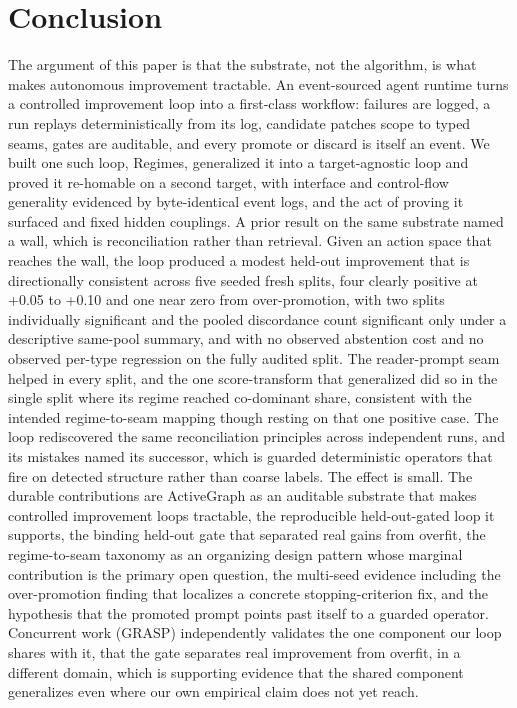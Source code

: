 \section{Conclusion}

The argument of this paper is that the substrate, not the algorithm, is what makes autonomous improvement tractable. An event-sourced agent runtime turns a controlled improvement loop into a first-class workflow: failures are logged, a run replays deterministically from its log, candidate patches scope to typed seams, gates are auditable, and every promote or discard is itself an event. We built one such loop, Regimes, generalized it into a target-agnostic loop and proved it re-homable on a second target, with interface and control-flow generality evidenced by byte-identical event logs, and the act of proving it surfaced and fixed hidden couplings. A prior result on the same substrate named a wall, which is reconciliation rather than retrieval. Given an action space that reaches the wall, the loop produced a modest held-out improvement that is directionally consistent across five seeded fresh splits, four clearly positive at +0.05 to +0.10 and one near zero from over-promotion, with two splits individually significant and the pooled discordance count significant only under a descriptive same-pool summary, and with no observed abstention cost and no observed per-type regression on the fully audited split. The reader-prompt seam helped in every split, and the one score-transform that generalized did so in the single split where its regime reached co-dominant share, consistent with the intended regime-to-seam mapping though resting on that one positive case. The loop rediscovered the same reconciliation principles across independent runs, and its mistakes named its successor, which is guarded deterministic operators that fire on detected structure rather than coarse labels. The effect is small. The durable contributions are ActiveGraph as an auditable substrate that makes controlled improvement loops tractable, the reproducible held-out-gated loop it supports, the binding held-out gate that separated real gains from overfit, the regime-to-seam taxonomy as an organizing design pattern whose marginal contribution is the primary open question, the multi-seed evidence including the over-promotion finding that localizes a concrete stopping-criterion fix, and the hypothesis that the promoted prompt points past itself to a guarded operator. Concurrent work (GRASP) independently validates the one component our loop shares with it, that the gate separates real improvement from overfit, in a different domain, which is supporting evidence that the shared component generalizes even where our own empirical claim does not yet reach.


